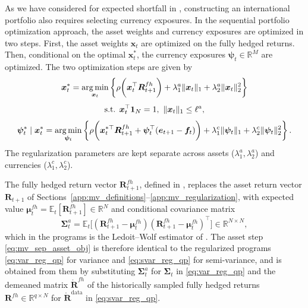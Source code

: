 As we have considered for expected shortfall in , constructing an international portfolio also requires
selecting currency exposures. In the sequential portfolio optimization approach, the asset weights and currency
exposures are optimized in two steps. First, the asset weights $\bm{x}_t$ are optimized on the fully hedged returns.
Then, conditional on the optimal $\bm{x}_t^*$, the currency exposures $\bm{\psi}_t \in \mathbb{R}^M$ are optimized. The
two optimization steps are given by
\begin{equation} \label{eq:mv_sep_asset_obj}
\begin{gathered}
    \bm{x}_t^* = \operatorname*{arg\,min}_{\bm{x}_t} \left\{ \rho\biggl( \bm{x}_t^\top \bm{R}^{fh}_{t+1} \biggr)
    + \lambda_1^a \|\bm{x}_t\|_1 + \lambda_2^a \|\bm{x}_t\|_2^2 \right\} \\[4pt]
    \text{s.t. } \bm{x}_t^\top \bm{1}_N = 1,\ \|\bm{x}_t\|_1 \le \ell^a,
\end{gathered}
\end{equation}
\begin{equation} \label{eq:mv_sep_curr_obj}
    \bm{\psi}_t^* \mid \bm{x}_t^* = \operatorname*{arg\,min}_{\bm{\psi}_t} \left\{
    \rho\biggl( \bm{x}_t^{*\top} \bm{R}^{fh}_{t+1} + \bm{\psi}_t^\top (\bm{e}_{t+1} - \bm{f}_t) \biggr)
    + \lambda_1^c \|\bm{\psi}_t\|_1 + \lambda_2^c \|\bm{\psi}_t\|_2^2 \right\}.
\end{equation}
The regularization parameters are kept separate across assets ($\lambda_1^a, \lambda_2^a$)
and currencies ($\lambda_1^c, \lambda_2^c$).

The fully hedged return vector $\bm{R}^{fh}_{t+1}$, defined in , replaces
the asset return vector $\bm{R}_{t+1}$ of Sections~\ref{app:mv_definitions}--\ref{app:mv_regularization}, with
expected value $\bm{\mu}^{fh}_t = \mathbb{E}_t[\bm{R}^{fh}_{t+1}] \in \mathbb{R}^N$ and conditional covariance matrix
\begin{equation*}
    \bm{\Sigma}^a_t = \mathbb{E}_t\bigl[ (\bm{R}^{fh}_{t+1} - \bm{\mu}^{fh}_t)(\bm{R}^{fh}_{t+1} - \bm{\mu}^{fh}_t)^\top \bigr]
    \in \mathbb{R}^{N \times N},
\end{equation*}
which in the programs is the Ledoit--Wolf estimator of . The asset step
\eqref{eq:mv_sep_asset_obj} is therefore identical to the regularized programs \eqref{eq:var_reg_qp} for variance and
\eqref{eq:svar_reg_qp} for semi-variance, and is obtained from them by substituting $\bm{\Sigma}^a_t$ for
$\bm{\Sigma}_t$ in \eqref{eq:var_reg_qp} and the demeaned matrix $\mathring{\bm{R}}^{fh}$ of the historically sampled fully hedged returns
$\bm{R}^{fh} \in \mathbb{R}^{q \times N}$ for $\mathring{\bm{R}}^{\text{data}}$ in \eqref{eq:svar_reg_qp}.

